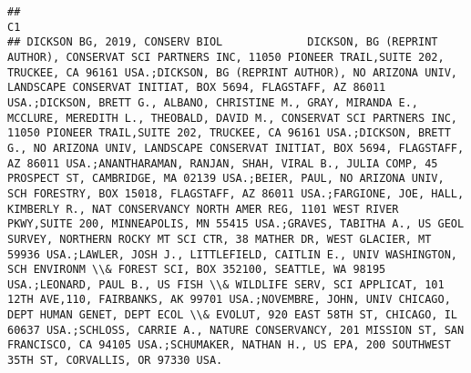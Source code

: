 \documentclass[]{article}
\begin{document}
\begin{verbatim}
##                                                                                                                                                                                                                                                                                                                                                                                                                                                                                                                                                                                                                                                                                                                                                                                                                                                                                                                                                                                                                                                                                                                                                                                                                                                                                                                                                                                                                                                                                                       C1
## DICKSON BG, 2019, CONSERV BIOL             DICKSON, BG (REPRINT AUTHOR), CONSERVAT SCI PARTNERS INC, 11050 PIONEER TRAIL,SUITE 202, TRUCKEE, CA 96161 USA.;DICKSON, BG (REPRINT AUTHOR), NO ARIZONA UNIV, LANDSCAPE CONSERVAT INITIAT, BOX 5694, FLAGSTAFF, AZ 86011 USA.;DICKSON, BRETT G., ALBANO, CHRISTINE M., GRAY, MIRANDA E., MCCLURE, MEREDITH L., THEOBALD, DAVID M., CONSERVAT SCI PARTNERS INC, 11050 PIONEER TRAIL,SUITE 202, TRUCKEE, CA 96161 USA.;DICKSON, BRETT G., NO ARIZONA UNIV, LANDSCAPE CONSERVAT INITIAT, BOX 5694, FLAGSTAFF, AZ 86011 USA.;ANANTHARAMAN, RANJAN, SHAH, VIRAL B., JULIA COMP, 45 PROSPECT ST, CAMBRIDGE, MA 02139 USA.;BEIER, PAUL, NO ARIZONA UNIV, SCH FORESTRY, BOX 15018, FLAGSTAFF, AZ 86011 USA.;FARGIONE, JOE, HALL, KIMBERLY R., NAT CONSERVANCY NORTH AMER REG, 1101 WEST RIVER PKWY,SUITE 200, MINNEAPOLIS, MN 55415 USA.;GRAVES, TABITHA A., US GEOL SURVEY, NORTHERN ROCKY MT SCI CTR, 38 MATHER DR, WEST GLACIER, MT 59936 USA.;LAWLER, JOSH J., LITTLEFIELD, CAITLIN E., UNIV WASHINGTON, SCH ENVIRONM \\& FOREST SCI, BOX 352100, SEATTLE, WA 98195 USA.;LEONARD, PAUL B., US FISH \\& WILDLIFE SERV, SCI APPLICAT, 101 12TH AVE,110, FAIRBANKS, AK 99701 USA.;NOVEMBRE, JOHN, UNIV CHICAGO, DEPT HUMAN GENET, DEPT ECOL \\& EVOLUT, 920 EAST 58TH ST, CHICAGO, IL 60637 USA.;SCHLOSS, CARRIE A., NATURE CONSERVANCY, 201 MISSION ST, SAN FRANCISCO, CA 94105 USA.;SCHUMAKER, NATHAN H., US EPA, 200 SOUTHWEST 35TH ST, CORVALLIS, OR 97330 USA.

\end{verbatim}
\end{document}
